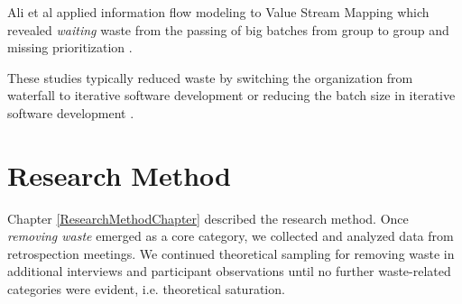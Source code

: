 Ali et al applied information flow modeling to Value Stream Mapping which revealed \textit{waiting} waste from the passing of big batches from group to group and missing prioritization \cite{Ali2016}.

These studies typically reduced waste by switching the organization from waterfall to iterative software development or reducing the batch size in iterative software development \cite{Ali2016, Khurum2014, Mujtaba2010}.

\section{Research Method}
\label{WasteResearchMethod}
Chapter \ref{ResearchMethodChapter} described the research method. Once \textit{removing waste} emerged as a core category, we collected and analyzed data from retrospection meetings. We continued theoretical sampling for removing waste in additional interviews and participant observations until no further waste-related categories were evident, i.e. theoretical saturation. 


